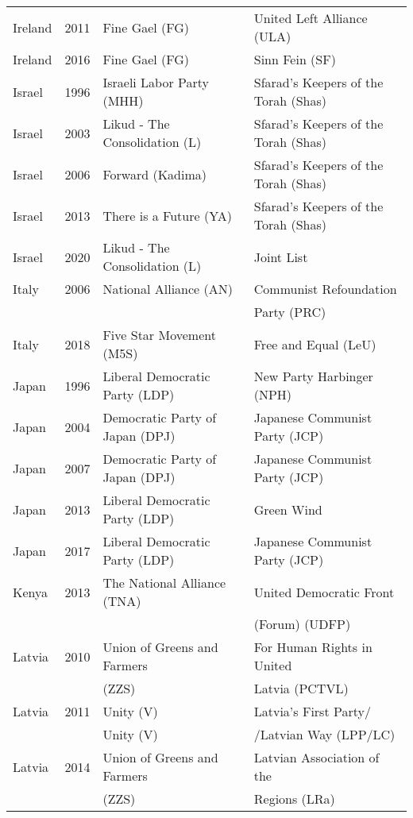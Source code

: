 {\begin{longtable}{|l|c|l|l|}
Ireland & 2011 &   Fine Gael (FG) &   United Left Alliance (ULA) \\ 
Ireland & 2016 &   Fine Gael (FG) &   Sinn Fein (SF) \\ 
Israel & 1996 &   Israeli Labor Party (MHH) &   Sfarad's Keepers of the    Torah (Shas)\\ 
Israel & 2003 &   Likud - The Consolidation (L) &   Sfarad's Keepers of the Torah (Shas)  \\ 
  Israel & 2006 &   Forward (Kadima) &   Sfarad's Keepers of the  Torah (Shas)  \\ 
  Israel & 2013 &   There is a Future (YA) &   Sfarad's Keepers of the  Torah (Shas) \\ 
  Israel & 2020 &   Likud - The Consolidation (L) &   Joint List   \\ 
  Italy & 2006 &   National Alliance (AN)   &   Communist Refoundation   \\ 
         &   &      &    Party (PRC) \\ 
  Italy & 2018 &   Five Star Movement (M5S) &   Free and Equal (LeU) \\ 
  Japan & 1996 &   Liberal Democratic Party (LDP) &   New Party Harbinger (NPH) \\ 
  Japan & 2004 &   Democratic Party of Japan (DPJ)   &   Japanese Communist Party (JCP) \\ 
  Japan & 2007 &   Democratic Party of Japan (DPJ)   &   Japanese Communist Party (JCP) \\ 
  Japan & 2013 &   Liberal Democratic Party (LDP) &   Green Wind \\ 
  Japan & 2017 &   Liberal Democratic Party (LDP) &   Japanese Communist Party (JCP) \\ 
  Kenya & 2013 &   The National Alliance (TNA) &   United Democratic Front   \\ 
         &      &    &    (Forum) (UDFP) \\ 
  Latvia & 2010 &   Union of Greens and Farmers     &   For Human Rights in United   \\ 
          &   &     (ZZS)   &    Latvia (PCTVL) \\ 
  Latvia & 2011 &   Unity (V) &   Latvia's First Party/   \\ 
         &      &   Unity (V) &    /Latvian Way (LPP/LC)   \\ 
  Latvia & 2014 &   Union of Greens and Farmers    &   Latvian Association of the  \\ 
         &   &     (ZZS)   &     Regions (LRa) \\

\end{longtable}}
